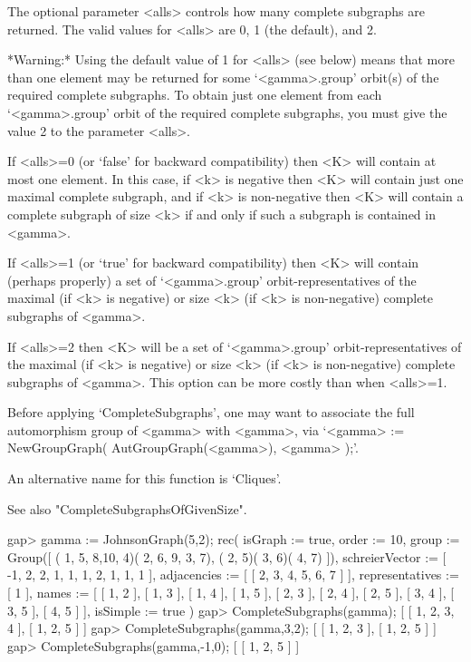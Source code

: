 The optional parameter <alls> controls how many complete subgraphs are
returned. The valid values for <alls> are 0, 1 (the default), and 2.

*Warning:* Using the default value of 1 for <alls> (see below) means that
more than one element may be returned for some `<gamma>.group' orbit(s)
of the required complete subgraphs.  To obtain just one element from each
`<gamma>.group' orbit of the required complete subgraphs, you must give
the value 2 to the parameter <alls>.

If <alls>=0 (or `false' for backward compatibility) then <K> will contain
at most one element. In this case, if <k> is negative then <K> will
contain just one maximal complete subgraph, and if <k> is non-negative
then <K> will contain a complete subgraph of size <k> if and only if
such a subgraph is contained in <gamma>.

If <alls>=1 (or `true' for backward compatibility) then <K> will contain
(perhaps properly) a set of `<gamma>.group' orbit-representatives of
the maximal (if <k> is negative) or size <k> (if <k> is non-negative)
complete subgraphs of <gamma>.

If <alls>=2 then <K> will be a set of `<gamma>.group'
orbit-representatives of the maximal (if <k> is negative) or size <k>
(if <k> is non-negative) complete subgraphs of <gamma>.  This option
can be more costly than when <alls>=1.

Before applying `CompleteSubgraphs', one may want to associate the full
automorphism group of <gamma> with <gamma>, via `<gamma> :=
NewGroupGraph( AutGroupGraph(<gamma>), <gamma> );'.

An alternative name for this function is `Cliques'.

See also "CompleteSubgraphsOfGivenSize".

\beginexample
gap> gamma := JohnsonGraph(5,2);
rec( isGraph := true, order := 10, 
  group := Group([ ( 1, 5, 8,10, 4)( 2, 6, 9, 3, 7), ( 2, 5)( 3, 6)( 4, 7) ]),
  schreierVector := [ -1, 2, 2, 1, 1, 1, 2, 1, 1, 1 ], 
  adjacencies := [ [ 2, 3, 4, 5, 6, 7 ] ], representatives := [ 1 ], 
  names := [ [ 1, 2 ], [ 1, 3 ], [ 1, 4 ], [ 1, 5 ], [ 2, 3 ], [ 2, 4 ], 
      [ 2, 5 ], [ 3, 4 ], [ 3, 5 ], [ 4, 5 ] ], isSimple := true )
gap> CompleteSubgraphs(gamma);
[ [ 1, 2, 3, 4 ], [ 1, 2, 5 ] ]
gap>  CompleteSubgraphs(gamma,3,2);
[ [ 1, 2, 3 ], [ 1, 2, 5 ] ]
gap> CompleteSubgraphs(gamma,-1,0);
[ [ 1, 2, 5 ] ]
\endexample


